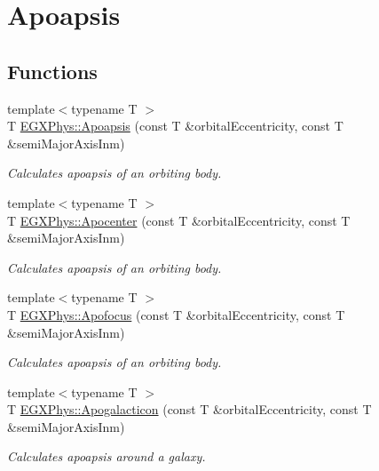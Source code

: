 \hypertarget{group___e_g_x_phys-_apoapsis}{}\section{Apoapsis}
\label{group___e_g_x_phys-_apoapsis}
\subsection*{Functions}
\begin{DoxyCompactItemize}
\item 
{\footnotesize template$<$typename T $>$ }\\T \mbox{\hyperlink{group___e_g_x_phys-_apoapsis_gafd08a2d1d64886e7bb9bcb7ff65bc3ea}{E\+G\+X\+Phys\+::\+Apoapsis}} (const T \&orbital\+Eccentricity, const T \&semi\+Major\+Axis\+Inm)
\begin{DoxyCompactList}\small\item\em Calculates apoapsis of an orbiting body. \end{DoxyCompactList}\item 
{\footnotesize template$<$typename T $>$ }\\T \mbox{\hyperlink{group___e_g_x_phys-_apoapsis_gaacffba78614c5b4d5488d8e9b8c661ee}{E\+G\+X\+Phys\+::\+Apocenter}} (const T \&orbital\+Eccentricity, const T \&semi\+Major\+Axis\+Inm)
\begin{DoxyCompactList}\small\item\em Calculates apoapsis of an orbiting body. \end{DoxyCompactList}\item 
{\footnotesize template$<$typename T $>$ }\\T \mbox{\hyperlink{group___e_g_x_phys-_apoapsis_gada28ef9258703e9e32ac9e564544ae87}{E\+G\+X\+Phys\+::\+Apofocus}} (const T \&orbital\+Eccentricity, const T \&semi\+Major\+Axis\+Inm)
\begin{DoxyCompactList}\small\item\em Calculates apoapsis of an orbiting body. \end{DoxyCompactList}\item 
{\footnotesize template$<$typename T $>$ }\\T \mbox{\hyperlink{group___e_g_x_phys-_apoapsis_gafef7ad033b39c29cdfe624cd48a6d616}{E\+G\+X\+Phys\+::\+Apogalacticon}} (const T \&orbital\+Eccentricity, const T \&semi\+Major\+Axis\+Inm)
\begin{DoxyCompactList}\small\item\em Calculates apoapsis around a galaxy. \end{DoxyCompactList}\item 

\end{DoxyCompactItemize}
